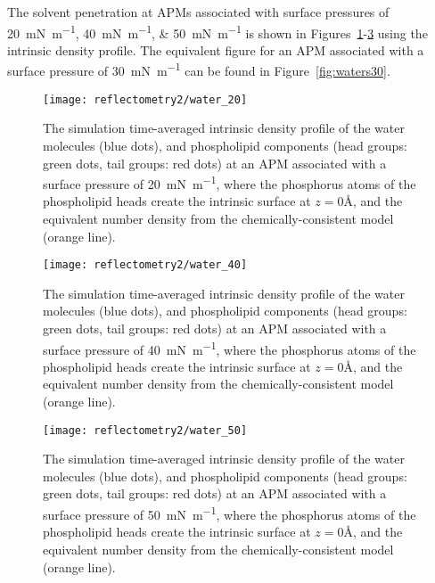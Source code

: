 %

The solvent penetration at APMs associated with surface pressures of \SIlist{20;40;50}{\milli\newton\per\meter} is shown in Figures~\ref{fig:waters20}-\ref{fig:waters50} using the intrinsic density profile.
The equivalent figure for an APM associated with a surface pressure of \SI{30}{\milli\newton\per\meter} can be found in Figure~\ref{fig:waters30}.
%
\begin{figure}
\forcerectofloat
    \centering
    \texttt{[image: reflectometry2/water\_20]}
    \caption{The simulation time-averaged intrinsic density profile of the water molecules (blue dots), and phospholipid components (head groups: green dots, tail groups: red dots) at an APM associated with a surface pressure of \SI{20}{\milli\newton\per\meter}, where the phosphorus atoms of the phospholipid heads create the intrinsic surface at $z=0$\si{\angstrom}, and the equivalent number density from the chemically-consistent model (orange line).}
    \label{fig:waters20}
\end{figure}
%
%
\begin{figure}
\forcerectofloat
    \centering
    \texttt{[image: reflectometry2/water\_40]}
    \caption{The simulation time-averaged intrinsic density profile of the water molecules (blue dots), and phospholipid components (head groups: green dots, tail groups: red dots) at an APM associated with a surface pressure of \SI{40}{\milli\newton\per\meter}, where the phosphorus atoms of the phospholipid heads create the intrinsic surface at $z=0$\si{\angstrom}, and the equivalent number density from the chemically-consistent model (orange line).}
    \label{fig:waters40}
\end{figure}
%
%
\begin{figure}
    \centering
    \texttt{[image: reflectometry2/water\_50]}
    \caption{The simulation time-averaged intrinsic density profile of the water molecules (blue dots), and phospholipid components (head groups: green dots, tail groups: red dots) at an APM associated with a surface pressure of \SI{50}{\milli\newton\per\meter}, where the phosphorus atoms of the phospholipid heads create the intrinsic surface at $z=0$\si{\angstrom}, and the equivalent number density from the chemically-consistent model (orange line).}
    \label{fig:waters50}
\end{figure}
%

